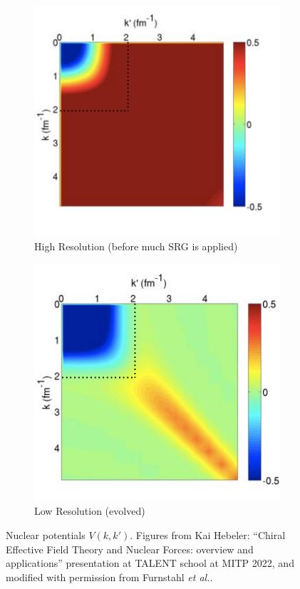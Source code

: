 \documentclass[a4paper,11pt]{article}
\newcommand{\etal}{\textit{et al.}}
\begin{document}
\begin{figure}[h]
  \centering
  \begin{subfigure}{0.45\textwidth}
    \centering
    \includegraphics[width=\linewidth]{HighRes.png}
    \caption{High Resolution (before much SRG is applied) }
    \label{fig:highres}
  \end{subfigure}
  \hfill
  \begin{subfigure}{0.45\textwidth}
    \centering
    \includegraphics[width=\linewidth]{LowRes.png}
    \caption{Low Resolution (evolved)}
    \label{fig:lowres}
  \end{subfigure}
  \caption{Nuclear potentials $V(k,k')$. Figures from Kai Hebeler:
    ``Chiral Effective Field Theory and Nuclear Forces:
  overview and applications'' presentation at TALENT school at MITP 2022, and modified with permission from
Furnstahl \etal \cite{Furnstahl2013}.
}
  \label{fig:SRGtransform}
\end{figure}
\end{document}

